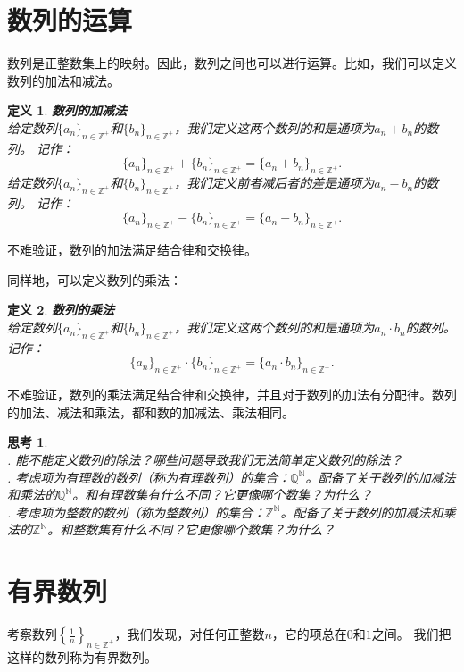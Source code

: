 \documentclass[12pt,UTF8]{ctexbook}
\newtheorem{df}{定义}[section]
\newtheorem{sk}{思考}[section]
\begin{document}
\section{数列的运算}

数列是正整数集上的映射。因此，数列之间也可以进行运算。比如，我们可以定义数列的加法和减法。

\begin{df}\textbf{数列的加减法}\\
    给定数列$\{a_n\}_{n\in\mathbb{Z}^+}$和$\{b_n\}_{n\in\mathbb{Z}^+}$，我们定义这两个数列的和是通项为$a_n + b_n$的数列。
    记作：
    $$ \{a_n\}_{n\in\mathbb{Z}^+} + \{b_n\}_{n\in\mathbb{Z}^+} = \{a_n + b_n\}_{n\in\mathbb{Z}^+}.$$
    给定数列$\{a_n\}_{n\in\mathbb{Z}^+}$和$\{b_n\}_{n\in\mathbb{Z}^+}$，我们定义前者减后者的差是通项为$a_n - b_n$的数列。
    记作：
    $$ \{a_n\}_{n\in\mathbb{Z}^+} - \{b_n\}_{n\in\mathbb{Z}^+} = \{a_n - b_n\}_{n\in\mathbb{Z}^+}.$$    
\end{df}

不难验证，数列的加法满足结合律和交换律。

同样地，可以定义数列的乘法：
\begin{df}\textbf{数列的乘法}\\
    给定数列$\{a_n\}_{n\in\mathbb{Z}^+}$和$\{b_n\}_{n\in\mathbb{Z}^+}$，我们定义这两个数列的和是通项为$a_n \cdot b_n$的数列。
    记作：
    $$ \{a_n\}_{n\in\mathbb{Z}^+} \cdot \{b_n\}_{n\in\mathbb{Z}^+} = \{a_n \cdot b_n\}_{n\in\mathbb{Z}^+}.$$    
\end{df}

不难验证，数列的乘法满足结合律和交换律，并且对于数列的加法有分配律。数列的加法、减法和乘法，都和数的加减法、乘法相同。

\begin{sk}
    \mbox{} \\
    . 能不能定义数列的除法？哪些问题导致我们无法简单定义数列的除法？\\
    . 考虑项为有理数的数列（称为有理数列）的集合：$\mathbb{Q}^{\mathbb{N}}$。配备了关于数列的加减法和乘法的$\mathbb{Q}^{\mathbb{N}}$。和有理数集有什么不同？它更像哪个数集？为什么？\\
    . 考虑项为整数的数列（称为整数列）的集合：$\mathbb{Z}^{\mathbb{N}}$。配备了关于数列的加减法和乘法的$\mathbb{Z}^{\mathbb{N}}$。和整数集有什么不同？它更像哪个数集？为什么？
\end{sk}

\section{有界数列}
考察数列$\left\{\frac{1}{n}\right\}_{n\in\mathbb{Z}^+}$，我们发现，对任何正整数$n$，它的项总在$0$和$1$之间。
我们把这样的数列称为有界数列。
\end{document}
